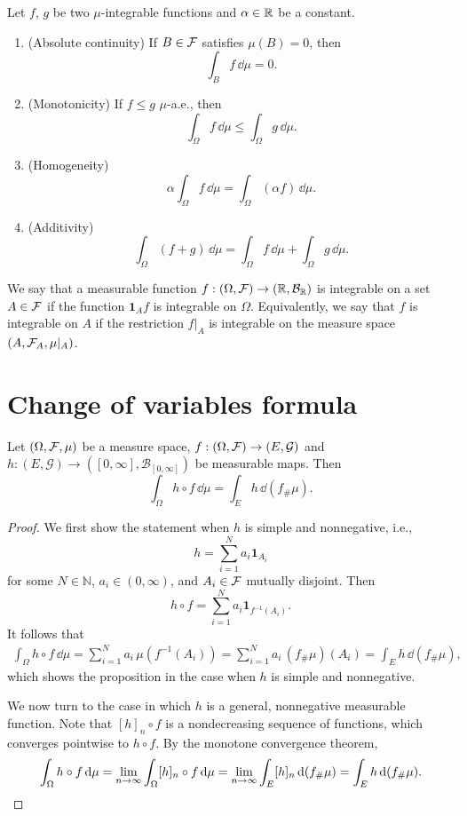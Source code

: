 \begin{proposition}
	Let $f$, $g$ be two $\mu$-integrable functions and $\alpha \in \mathbb R$ be a constant.
	\begin{enumerate}
		\item (Absolute continuity) If $B \in \mathcal F$ satisfies $\mu(B) = 0$, then
		\[
		\int_{B} f\, \dd \mu = 0. 
		\]
		\item (Monotonicity) If $f \leq g$ $\mu$-a.e., then
		\[
		\int_\Omega f \,\dd \mu \leq \int_\Omega g \,\dd \mu.
		\]
		\item (Homogeneity) 
		\[
		\alpha \int_\Omega f \,\dd \mu = \int_\Omega (\alpha f )\,\dd \mu.
		\]
		\item (Additivity)
		\[
		\int_\Omega (f + g)\, \dd \mu = \int_\Omega f 
		\,\dd \mu + \int_\Omega g \,\dd \mu.
		\]	
	\end{enumerate}
\end{proposition}

\begin{definition}
We say that a measurable function $f:(\Omega, \mathcal F) \to (\mathbb R, \mathcal{B}_{\mathbb R})$ is integrable on a set $A \in \mathcal F$ if the function $\mathbf{1}_A f$ is integrable on $\Omega$. Equivalently, we say that $f$ is integrable on $A$ if the restriction $f|_A$ is integrable on the measure space $(A, \mathcal F_A, \mu|_A)$. 
\end{definition}
	
\section{Change of variables formula}
\label{sec:change-of-variables}

\begin{proposition}
Let $(\Omega, \mathcal F, \mu)$ be a measure space, $f: (\Omega, \mathcal F) \to (E, \mathcal{G})$ and $h: (E, \mathcal{G}) \to ([0,\infty], \mathcal{B}_{[0,\infty]})$ be measurable maps. Then
\[
\int_\Omega h \circ f\,\dd \mu = \int_E h \, \dd (f_\# \mu).
\]
\end{proposition}

\begin{proof}
We first show the statement when $h$ is simple and nonnegative, i.e.,
\[
h = \sum_{i=1}^N a_i \mathbf{1}_{A_i}
\]
for some $N \in \mathbb{N}$, $a_i \in (0,\infty)$, and $A_i \in \mathcal F$ mutually disjoint. Then 
\[
	h \circ f = \sum_{i=1}^N a_i  \mathbf{1}_{f^{-1}(A_i)}.
\]
It follows that
\[
\begin{split}
\int_\Omega h \circ f\, \dd \mu 
= \sum_{i=1}^N a_i \, \mu(f^{-1}(A_i)) 
= \sum_{i=1}^N a_i \, (f_\# \mu)(A_i) 
= \int_E h \, \dd (f_\# \mu),
\end{split}
\]
which shows the proposition in the case when $h$ is simple and nonnegative. 

We now turn to the case in which $h$ is a general, nonnegative measurable function. Note that $[h]_n \circ f$ is a nondecreasing sequence of functions, which converges pointwise to $h \circ f$. By the monotone convergence theorem,
\[
\int_\Omega h \circ f\, \mathrm{d} \mu 
= \lim_{n \to \infty} \int_\Omega [h]_n \circ f\, \mathrm{d} \mu 
= \lim_{n \to \infty} \int_E [h]_n \, \mathrm{d} (f_\# \mu) 
= \int_E h \, \mathrm{d} (f_\# \mu).\qedhere
\]
\end{proof}

